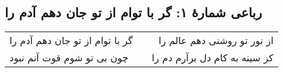 \begin{center}
\section*{رباعی شمارهٔ ۱: گر با توام از تو جان دهم آدم را }
\label{sec:001}
\begin{longtable}{l p{0.5cm} r}
گر با توام از تو جان دهم آدم را 
&&
از نور تو روشنی دهم عالم را 
\\
چون بی تو شوم قوت آنم نبود
&&
کز سینه به کام دل برآرم دم را 
\\
\end{longtable}
\end{center}

